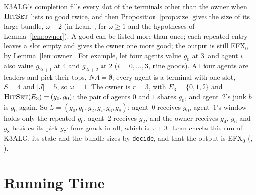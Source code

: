\documentclass[runningheads,11pt]{llncs}
\newcommand{\efxz}{\texorpdfstring{\mbox{EFX$_0$}}{EFX0}}
\newcommand{\NA}{\mathit{NA}}
\newcommand{\HitSet}{\textup{\textsc{HitSet}}}
\begin{document}
\begin{remark}\label{rem:repeat}
K3ALG's completion fills every slot of the terminals other than the owner when $\HitSet$ lists no good twice, and then Proposition~\ref{prop:size} gives the size of its large bundle, $\omega+2$ (in Lean, , for $\omega\ge1$ and the hypotheses of Lemma~\ref{lem:owner}). A good can be listed more than once; each repeated entry leaves a slot empty and gives the owner one more good; the output is still \efxz{} by Lemma~\ref{lem:owner}. For example, let four agents value $g_0$ at $3$, and agent $i$ also value $g_{2i+1}$ at $4$ and $g_{2i+2}$ at $2$ ($i=0,\dots,3$, nine goods). All four agents are leaders and pick their tops, $\NA=\emptyset$, every agent is a terminal with one slot, $S=4$ and $|J|=5$, so $\omega=1$. The owner is $r=3$, with $E_3=\{0,1,2\}$ and $\HitSet(E_3)=(g_0,g_0)$: the pair of agents $0$ and $1$ shares $g_0$, and agent~$2$'s junk $b$ is $g_0$ again. So $L=(g_0,g_0,g_2,g_4,g_6,g_8)$: agent~$0$ receives $g_0$, agent~$1$'s window holds only the repeated $g_0$, agent~$2$ receives $g_2$, and the owner receives $g_4$, $g_6$ and $g_8$ besides its pick $g_7$: four goods in all, which is $\omega+3$. Lean checks this run of K3ALG, its state and the bundle sizes by \texttt{decide}, and that the output is \efxz{} (, ).
\end{remark}

\section{Running Time}\label{sec:time}
\end{document}
